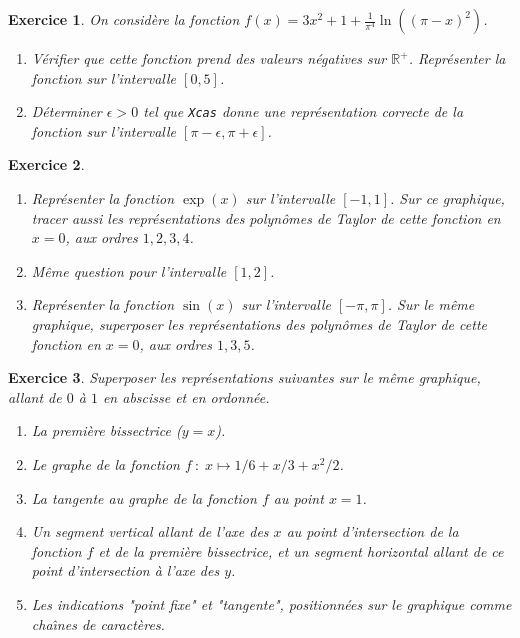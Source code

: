 \documentclass{article}
\newtheorem{exo}{Exercice}[section]
\begin{document}
\begin{exo}{\rm
On consid\`ere la fonction
$f(x)=3x^2+1+\frac{1}{\pi^4}\ln((\pi-x)^2)$.
\begin{enumerate}
\item
V\'erifier que cette fonction prend des valeurs n\'egatives sur
$\mathbb{R}^+$. Repr\'esenter la fonction sur l'intervalle $[0,5]$.
\item
D\'eterminer $\epsilon >0$ tel que {\tt Xcas} donne une repr\'esentation
correcte de la fonction sur l'intervalle 
$[\pi-\epsilon,\pi+\epsilon]$. 
\end{enumerate}
}\end{exo}
\begin{exo}{\rm~
\begin{enumerate}
\item
Repr\'esenter la fonction $\exp(x)$ sur l'intervalle $[-1,1]$. 
Sur ce graphique, tracer aussi les repr\'esentations 
des polyn\^omes de Taylor de cette fonction en $x=0$, aux ordres
$1,2,3,4$.
\item
M\^eme question pour l'intervalle $[1,2]$. 
\item
Repr\'esenter la fonction $\sin(x)$ sur l'intervalle $[-\pi,\pi]$. Sur
le m\^eme graphique, superposer les repr\'esentations 
des polyn\^omes de Taylor de cette fonction en $x=0$, aux ordres
$1,3,5$.
\end{enumerate}
}\end{exo}
\begin{exo}{\rm
Superposer les repr\'esentations suivantes sur le m\^eme graphique, 
allant de $0$ \`a $1$ en abscisse et en ordonn\'ee.
\begin{enumerate}
\item
La premi\`ere bissectrice ($y=x$).
\item
Le graphe de la fonction $f~: \;x\mapsto 1/6+x/3+x^2/2$.
\item
La tangente au graphe de la fonction $f$ au point $x=1$.
\item
Un segment vertical allant de l'axe des $x$ au 
point d'intersection de la fonction $f$ et de
la premi\`ere bissectrice, et
un segment horizontal allant de ce point d'intersection
\`a l'axe des $y$.
\item
Les indications "point fixe" et "tangente", positionn\'ees sur le
graphique comme cha\^\i nes de caract\`eres.
\end{enumerate} 
}\end{exo}
\end{document}

